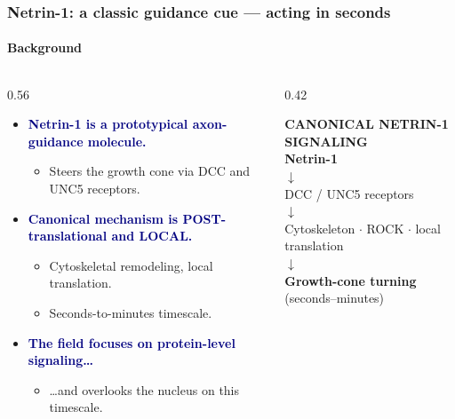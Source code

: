 \documentclass[aspectratio=169,11pt]{beamer}
\newcommand{\hi}[1]{\textcolor{navy}{\textbf{#1}}}
\begin{document}
\begin{frame}
  \frametitle{Netrin-1: a classic guidance cue --- acting in seconds}\framesubtitle{Background}
  \begin{columns}[T]
    \begin{column}{0.56\textwidth}
      \begin{itemize}\setlength\itemsep{6pt}
        \item \hi{Netrin-1 is a prototypical axon-guidance molecule.}
          \begin{itemize}\item Steers the growth cone via DCC and UNC5 receptors.\end{itemize}
        \item \hi{Canonical mechanism is POST-translational and LOCAL.}
          \begin{itemize}
            \item Cytoskeletal remodeling, local translation.
            \item Seconds-to-minutes timescale.
          \end{itemize}
        \item \hi{The field focuses on protein-level signaling\ldots}
          \begin{itemize}\item \ldots and overlooks the nucleus on this timescale.\end{itemize}
      \end{itemize}
    \end{column}
    \begin{column}{0.42\textwidth}
      \colorbox{lbg}{\parbox{\textwidth}{\centering\vskip3pt
        {\color{teald}\scriptsize\bfseries CANONICAL NETRIN-1 SIGNALING}\\[6pt]
        {\color{navy}\bfseries Netrin-1}\\[2pt]{\color{teal}$\downarrow$}\\[2pt]
        DCC / UNC5 receptors\\[2pt]{\color{teal}$\downarrow$}\\[2pt]
        Cytoskeleton $\cdot$ ROCK $\cdot$ local translation\\[2pt]{\color{teal}$\downarrow$}\\[2pt]
        {\color{navy}\bfseries Growth-cone turning}\\{\footnotesize(seconds--minutes)}\vskip4pt}}
    \end{column}
  \end{columns}
\end{frame}
\end{document}
